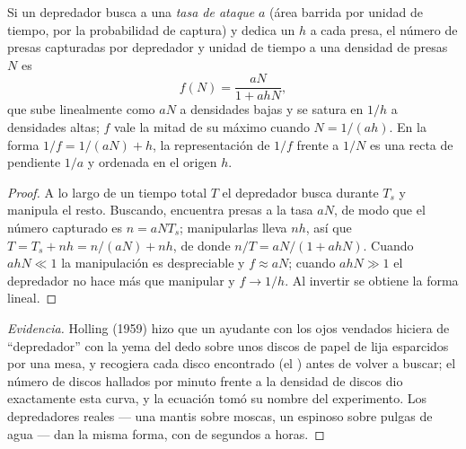 \begin{theorem}\label{thm:b1:species-interactions:holling}
Si un depredador busca a una \emph{tasa de ataque} $a$ (área barrida por
unidad de tiempo, por la probabilidad de captura) y dedica un  $h$ a cada presa, el número de presas capturadas por depredador
y unidad de tiempo a una densidad de presas $N$ es
\[
f(N) = \frac{aN}{1 + ahN} ,
\]
que sube linealmente como $aN$ a densidades bajas y se satura en $1/h$ a
densidades altas; $f$ vale la mitad de su máximo cuando $N = 1/(ah)$. En la
forma $1/f = 1/(aN) + h$, la representación de $1/f$ frente a $1/N$ es una
recta de pendiente $1/a$ y ordenada en el origen $h$.
\end{theorem}
\begin{proof}
A lo largo de un tiempo total $T$ el depredador busca durante $T_s$ y
manipula el resto. Buscando, encuentra presas a la tasa $aN$, de modo que el
número capturado es $n = aN T_s$; manipularlas lleva $nh$, así que $T = T_s + nh =
n/(aN) + nh$, de donde $n/T = aN/(1 + ahN)$. Cuando $ahN \ll 1$ la
manipulación es despreciable y $f \approx aN$; cuando $ahN \gg 1$ el
depredador no hace más que manipular y $f \to 1/h$. Al invertir se obtiene
la forma lineal.
\end{proof}
\begin{proof}[Evidencia]
Holling (1959) hizo que un ayudante con los ojos vendados hiciera de
``depredador'' con la yema del dedo sobre unos discos de papel de lija
esparcidos por una mesa, y recogiera cada disco encontrado (el ) antes de volver a buscar; el número de discos hallados por
minuto frente a la densidad de discos dio exactamente esta curva, y la
ecuación tomó su nombre del experimento. Los depredadores reales --- una
mantis sobre moscas, un espinoso sobre pulgas de agua --- dan la misma
forma, con  de segundos a horas.
\end{proof}

